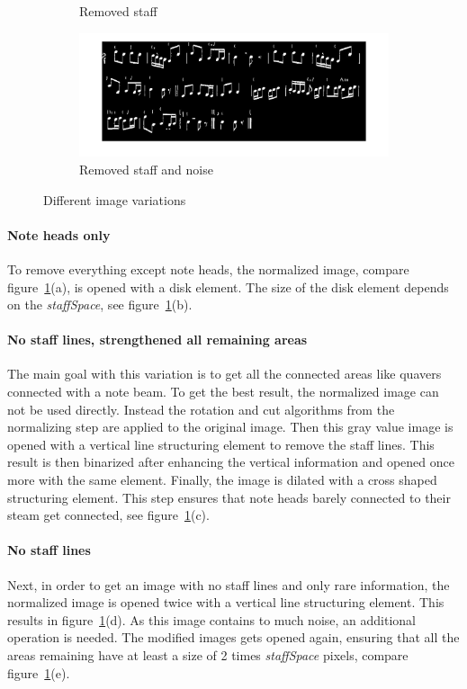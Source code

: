 \begin{figure}[htbp]
\begin{subfigure}[b]{0.7\textwidth}
        \caption{Removed staff}
  \end{subfigure}
  \begin{subfigure}[b]{0.7\textwidth}
        \includegraphics[width=\textwidth]{iv_remStaff_afterDefiningAreaSize.jpg}
        \caption{Removed staff and noise}
  \end{subfigure}
	\caption{Different image variations}
	\label{fig:variations}
\end{figure}





\paragraph{Note heads only}
To remove everything except note heads, the normalized image, compare  figure~\ref{fig:variations}(a), is opened with a disk element. The size of the disk element depends on the \textit{staffSpace}, see  figure~\ref{fig:variations}(b). 


\paragraph{No staff lines, strengthened all remaining areas}
The main goal with this variation is to get all the connected areas like quavers connected with a note beam. To get the best result, the normalized image can not be used directly. Instead the rotation and cut algorithms from the normalizing step are applied to the original image. Then this gray value image is opened with a vertical line structuring element to remove the staff lines. This result is then binarized after enhancing the vertical information and opened once more with the same element. Finally, the image is dilated with a cross shaped structuring element. This step ensures that note heads barely connected to their steam get connected, see figure~\ref{fig:variations}(c).  

\paragraph{No staff lines}
Next, in order to get an image with no staff lines and only rare information, the normalized image is opened twice with a vertical line structuring element. This results in  figure~\ref{fig:variations}(d). As this image contains to much noise, an additional operation is needed. The modified images gets opened again, ensuring that all the areas remaining have at least a size of 2 times \textit{staffSpace} pixels, compare  figure~\ref{fig:variations}(e).



